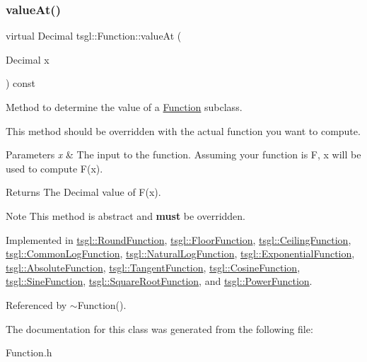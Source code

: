 \subsubsection{\texorpdfstring{value\+At()}{valueAt()}}
{\footnotesize\ttfamily virtual Decimal tsgl\+::\+Function\+::value\+At (\begin{DoxyParamCaption}\item[{Decimal}]{x }\end{DoxyParamCaption}) const\hspace{0.3cm}{\ttfamily [pure virtual]}}



Method to determine the value of a \hyperlink{classtsgl_1_1_function}{Function} subclass. 

This method should be overridden with the actual function you want to compute. 
\begin{DoxyParams}{Parameters}
{\em x} & The input to the function. Assuming your function is F, x will be used to compute F(x). \\
\hline
\end{DoxyParams}
\begin{DoxyReturn}{Returns}
The Decimal value of F(x). 
\end{DoxyReturn}
\begin{DoxyNote}{Note}
This method is abstract and {\bfseries must} be overridden. 
\end{DoxyNote}


Implemented in \hyperlink{classtsgl_1_1_round_function_ad01ca0b18d7b5f3f8c5a49181b1dc922}{tsgl\+::\+Round\+Function}, \hyperlink{classtsgl_1_1_floor_function_a28fae5b310ae965348fb2eaec50fd5c8}{tsgl\+::\+Floor\+Function}, \hyperlink{classtsgl_1_1_ceiling_function_a01487798ff6e2adc9481177e96e4e89c}{tsgl\+::\+Ceiling\+Function}, \hyperlink{classtsgl_1_1_common_log_function_a18f2c4f8779309e0d1c936a0589b1f3a}{tsgl\+::\+Common\+Log\+Function}, \hyperlink{classtsgl_1_1_natural_log_function_a27894f0360a0f89cf01126781a36e500}{tsgl\+::\+Natural\+Log\+Function}, \hyperlink{classtsgl_1_1_exponential_function_a65c7a08da7e5e0bdbf5dbcb13f046eb5}{tsgl\+::\+Exponential\+Function}, \hyperlink{classtsgl_1_1_absolute_function_a57c7114b54ebfc4a35da1b5e9374e495}{tsgl\+::\+Absolute\+Function}, \hyperlink{classtsgl_1_1_tangent_function_af0ca18ffd1bccefb8ede5c1121e3813c}{tsgl\+::\+Tangent\+Function}, \hyperlink{classtsgl_1_1_cosine_function_a2d7841c4f9f77bdd8f5bbc51cbd80bcd}{tsgl\+::\+Cosine\+Function}, \hyperlink{classtsgl_1_1_sine_function_a4a34d3310ea217255124d5e35805be3a}{tsgl\+::\+Sine\+Function}, \hyperlink{classtsgl_1_1_square_root_function_ad77fa33b36dcf3bcb7d7957e489bf33f}{tsgl\+::\+Square\+Root\+Function}, and \hyperlink{classtsgl_1_1_power_function_a1dfcce604dd60b033969807f6312b074}{tsgl\+::\+Power\+Function}.



Referenced by $\sim$\+Function().



The documentation for this class was generated from the following file\+:\begin{DoxyCompactItemize}
\item 
Function.\+h\end{DoxyCompactItemize}

